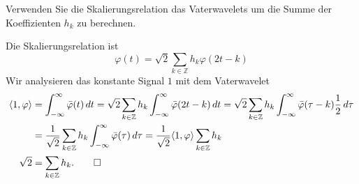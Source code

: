 Verwenden Sie die Skalierungsrelation das Vaterwavelets um die
Summe der Koeffizienten $h_k$ zu berechnen.

\begin{loesung}
Die Skalierungsrelation ist
\[
\varphi(t) = \sqrt{2} \sum_{k\in\mathbb Z} h_k \varphi(2t-k)
\]
Wir analysieren das konstante Signal $1$ mit dem Vaterwavelet
\begin{align*}
\langle 1,\varphi\rangle
&=
\int_{-\infty}^\infty
\bar{\varphi}(t)\,dt
=
\sqrt{2}
\sum_{k\in\mathbb Z} 
h_k
\int_{-\infty}^\infty
\bar{\varphi}(2t-k)
\,dt
=
\sqrt{2}
\sum_{k\in\mathbb Z} 
h_k
\int_{-\infty}^\infty
\bar{\varphi}(\tau-k)
\frac12
\,d\tau
\\
&=
\frac{1}{\sqrt{2}}
\sum_{k\in\mathbb Z} 
h_k
\int_{-\infty}^\infty
\bar{\varphi}(\tau)
\,d\tau
=
\frac{1}{\sqrt{2}}
\langle 1,\varphi\rangle
\sum_{k\in\mathbb Z} h_k
\\
\sqrt{2}
&=
\sum_{k\in\mathbb Z} h_k.
\qedhere
\end{align*}
\end{loesung}


